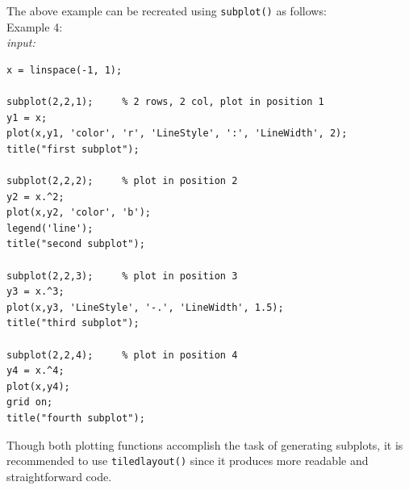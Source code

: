 \documentclass[../MATLAB_Primer.tex]{subfiles}
\begin{document}
The above example can be recreated using \texttt{subplot()} as follows:\\

Example 4:\\

\textit{input:}
\begin{lstlisting}
x = linspace(-1, 1);

subplot(2,2,1);     % 2 rows, 2 col, plot in position 1
y1 = x;
plot(x,y1, 'color', 'r', 'LineStyle', ':', 'LineWidth', 2);
title("first subplot");

subplot(2,2,2);     % plot in position 2
y2 = x.^2;
plot(x,y2, 'color', 'b');
legend('line');
title("second subplot");

subplot(2,2,3);     % plot in position 3
y3 = x.^3;
plot(x,y3, 'LineStyle', '-.', 'LineWidth', 1.5);
title("third subplot");

subplot(2,2,4);     % plot in position 4
y4 = x.^4;
plot(x,y4);
grid on;
title("fourth subplot");
\end{lstlisting}

Though both plotting functions accomplish the task of generating subplots, it is recommended to use \texttt{tiledlayout()} since it produces more readable and straightforward code.
\end{document}
